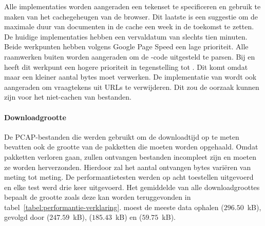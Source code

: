 Alle implementaties worden aangeraden een tekenset te specificeren en gebruik te maken van het cachegeheugen van de browser.
Dit laatste is een suggestie om de maximale duur van documenten in de cache een week in de toekomst te zetten.
De huidige implementaties hebben een vervaldatum van slechts tien minuten.
Beide werkpunten hebben volgens Google Page Speed een lage prioriteit.
Alle raamwerken buiten \st{} worden aangeraden om de \js-code uitgesteld te parsen.
Bij \kendo{} en \jqm{} heeft dit werkpunt een hogere prioriteit in tegenstelling tot \lungo{}.
Dit komt omdat \lungo{} maar een kleiner aantal bytes moet verwerken.
De implementatie van \st{} wordt ook aangeraden om vraagtekens uit URLs te verwijderen.
Dit zou de oorzaak kunnen zijn voor het niet-cachen van bestanden.


\paragraph{Downloadgrootte}
De PCAP-bestanden die werden gebruikt om de downloadtijd op te meten bevatten ook de grootte van de pakketten die moeten worden opgehaald.
Omdat pakketten verloren gaan, zullen ontvangen bestanden incompleet zijn en moeten ze worden herverzonden.
Hierdoor zal het aantal ontvangen bytes variëren van meting tot meting.
De performantietesten werden op acht toestellen uitgevoerd en elke test werd drie keer uitgevoerd.
Het gemiddelde van alle downloadgroottes bepaalt de grootte zoals deze kan worden teruggevonden in tabel~\ref{tabel:performantie-verklaring}.
\kendo{} moest de meeste data ophalen ($296.50$~kB),  gevolgd door \st{} ($247.59$~kB), \jqm{} ($185.43$~kB) en \lungo{} ($59.75$~kB).

